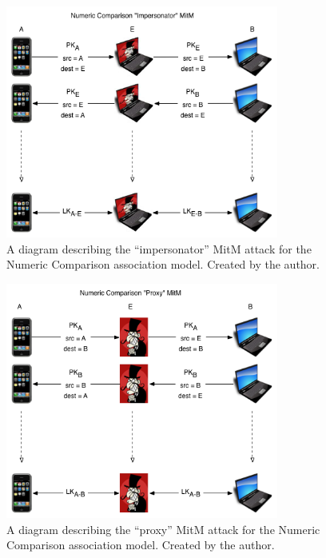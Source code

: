 \documentclass{acm_proc_article-sp}
\begin{document}
\begin{figure}
    \begin{center}
        \includegraphics[width=0.8\textwidth]{diagrams/nc_impersonator_mitm.png}
        \caption{A diagram describing the ``impersonator'' MitM attack for the Numeric Comparison association model. Created by the author.}
        \label{nc_impersonator_mitm}
    \end{center}
\end{figure}

\begin{figure}
    \begin{center}
        \includegraphics[width=0.8\textwidth]{diagrams/nc_proxy_mitm.png}
        \caption{A diagram describing the ``proxy'' MitM attack for the Numeric Comparison association model. Created by the author.}
        \label{nc_proxy_mitm}
    \end{center}
\end{figure}

\balancecolumns
\end{document}
